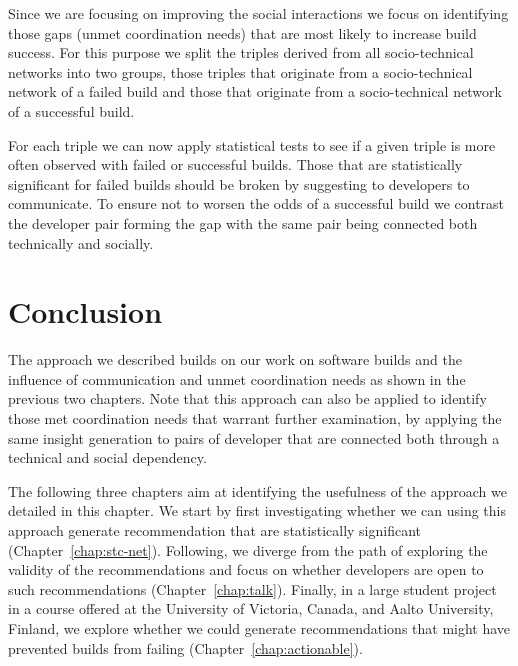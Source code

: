 Since we are focusing on improving the social interactions we focus on identifying those gaps (unmet coordination needs) that are most likely to increase build success.
For this purpose we split the triples derived from all socio-technical networks into two groups, those triples that originate from a socio-technical network of a failed build and those that originate from a socio-technical network of a successful build.

For each triple we can now apply statistical tests to see if a given triple is more often observed with failed or successful builds.
Those that are statistically significant for failed builds should be broken by suggesting to developers to communicate.
To ensure not to worsen the odds of a successful build we contrast the developer pair forming the gap with the same pair being connected both technically and socially.

\section{Conclusion}
The approach we described builds on our work on software builds and the influence of communication and unmet coordination needs as shown in the previous two chapters.
Note that this approach can also be applied to identify those met coordination needs that warrant further examination, by applying the same insight generation to pairs of developer that are connected both through a technical and social dependency.

The following three chapters aim at identifying the usefulness of the approach we detailed in this chapter.
We start by first investigating whether we can using this approach generate recommendation that are statistically significant (Chapter~\ref{chap:stc-net}).
Following, we diverge from the path of exploring the validity of the recommendations and focus on whether developers are open to such recommendations (Chapter~\ref{chap:talk}).
Finally, in a large student project in a course offered at the University of Victoria, Canada, and Aalto University, Finland, we explore whether we could generate recommendations that might have prevented builds from failing (Chapter~\ref{chap:actionable}).